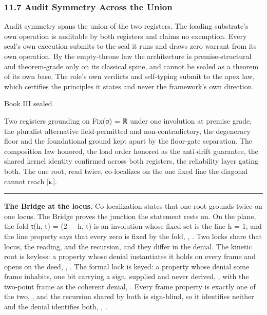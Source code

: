 \documentclass[10pt,twocolumn]{article}
\begin{document}
\hypertarget{audit-symmetry-across-the-union}{%
\subsubsection{11.7 Audit Symmetry Across the
Union}\label{audit-symmetry-across-the-union}}

Audit symmetry spans the union of the two registers. The loading
substrate's own operation is auditable by both registers and claims no
exemption. Every seal's own execution submits to the seal it runs and
draws zero warrant from its own operation. By the empty-throne law the
architecture is premise-structural and theorem-grade only on its
classical spine, and cannot be sealed as a theorem of its own base. The
role's own verdicts and self-typing submit to the apex law, which
certifies the principles it states and never the framework's own
direction.

\begin{jbox}{Book III sealed}

Two registers grounding on Fix(σ) = ℝ under one involution at premise
grade, the pluralist alternative field-permitted and non-contradictory,
the degeneracy floor and the foundational ground kept apart by the
floor-gate separation. The composition law honored, the load order
honored as the anti-drift guarantee, the shared kernel identity
confirmed across both registers, the reliability layer gating both. The
one root, read twice, co-localizes on the one fixed line the diagonal
cannot reach {[}⟀{]}.

\end{jbox}

\begin{center}\rule{0.5\linewidth}{0.5pt}\end{center}

\textbf{The Bridge at the locus.} Co-localization states that one root
grounds twice on one locus. The Bridge proves the junction the statement
rests on. On the plane, the fold τ(h, t) = (2 − h, t) is an involution
whose fixed set is the line h = 1, and the line property says that every
zero is fixed by the fold,
\texttt{},
\texttt{}. Two locks share that
locus, the reading, and the recursion, and they differ in the denial.
The kinetic root is keyless: a property whose denial instantiates it
holds on every frame and opens on the deed,
\texttt{},
\texttt{}. The formal lock is
keyed: a property whose denial some frame inhabits, one bit carrying a
sign, supplied and never derived,
\texttt{}, with the two-point
frame as the coherent denial,
\texttt{}. Every frame property is
exactly one of the two, \texttt{}, and
the recursion shared by both is sign-blind, so it identifies neither and
the denial identifies both,
\texttt{},
\texttt{}.
\end{document}
